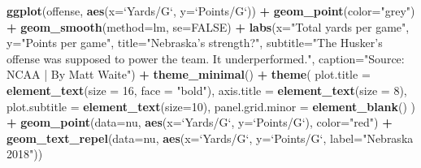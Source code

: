 \documentclass[
]{book}
\newenvironment{Shaded}{\begin{snugshade}}{\end{snugshade}}
\newcommand{\DataTypeTok}[1]{\textcolor[rgb]{0.13,0.29,0.53}{#1}}
\newcommand{\DecValTok}[1]{\textcolor[rgb]{0.00,0.00,0.81}{#1}}
\newcommand{\KeywordTok}[1]{\textcolor[rgb]{0.13,0.29,0.53}{\textbf{#1}}}
\newcommand{\NormalTok}[1]{#1}
\newcommand{\OperatorTok}[1]{\textcolor[rgb]{0.81,0.36,0.00}{\textbf{#1}}}
\newcommand{\OtherTok}[1]{\textcolor[rgb]{0.56,0.35,0.01}{#1}}
\newcommand{\StringTok}[1]{\textcolor[rgb]{0.31,0.60,0.02}{#1}}
\begin{document}
\begin{Shaded}
\begin{Highlighting}[]
\KeywordTok{ggplot}\NormalTok{(offense, }\KeywordTok{aes}\NormalTok{(}\DataTypeTok{x=}\StringTok{`}\DataTypeTok{Yards/G}\StringTok{`}\NormalTok{, }\DataTypeTok{y=}\StringTok{`}\DataTypeTok{Points/G}\StringTok{`}\NormalTok{)) }\OperatorTok{+}\StringTok{ }
\StringTok{  }\KeywordTok{geom_point}\NormalTok{(}\DataTypeTok{color=}\StringTok{"grey"}\NormalTok{) }\OperatorTok{+}\StringTok{ }\KeywordTok{geom_smooth}\NormalTok{(}\DataTypeTok{method=}\NormalTok{lm, }\DataTypeTok{se=}\OtherTok{FALSE}\NormalTok{) }\OperatorTok{+}\StringTok{ }
\StringTok{  }\KeywordTok{labs}\NormalTok{(}\DataTypeTok{x=}\StringTok{"Total yards per game"}\NormalTok{, }\DataTypeTok{y=}\StringTok{"Points per game"}\NormalTok{, }\DataTypeTok{title=}\StringTok{"Nebraska's strength?"}\NormalTok{, }\DataTypeTok{subtitle=}\StringTok{"The Husker's offense was supposed to power the team. It underperformed."}\NormalTok{, }\DataTypeTok{caption=}\StringTok{"Source: NCAA | By Matt Waite"}\NormalTok{) }\OperatorTok{+}\StringTok{ }
\StringTok{  }\KeywordTok{theme_minimal}\NormalTok{() }\OperatorTok{+}\StringTok{ }
\StringTok{  }\KeywordTok{theme}\NormalTok{(}
    \DataTypeTok{plot.title =} \KeywordTok{element_text}\NormalTok{(}\DataTypeTok{size =} \DecValTok{16}\NormalTok{, }\DataTypeTok{face =} \StringTok{"bold"}\NormalTok{),}
    \DataTypeTok{axis.title =} \KeywordTok{element_text}\NormalTok{(}\DataTypeTok{size =} \DecValTok{8}\NormalTok{), }
    \DataTypeTok{plot.subtitle =} \KeywordTok{element_text}\NormalTok{(}\DataTypeTok{size=}\DecValTok{10}\NormalTok{), }
    \DataTypeTok{panel.grid.minor =} \KeywordTok{element_blank}\NormalTok{()}
\NormalTok{    ) }\OperatorTok{+}
\StringTok{  }\KeywordTok{geom_point}\NormalTok{(}\DataTypeTok{data=}\NormalTok{nu, }\KeywordTok{aes}\NormalTok{(}\DataTypeTok{x=}\StringTok{`}\DataTypeTok{Yards/G}\StringTok{`}\NormalTok{, }\DataTypeTok{y=}\StringTok{`}\DataTypeTok{Points/G}\StringTok{`}\NormalTok{), }\DataTypeTok{color=}\StringTok{"red"}\NormalTok{) }\OperatorTok{+}\StringTok{ }
\StringTok{  }\KeywordTok{geom_text_repel}\NormalTok{(}\DataTypeTok{data=}\NormalTok{nu, }\KeywordTok{aes}\NormalTok{(}\DataTypeTok{x=}\StringTok{`}\DataTypeTok{Yards/G}\StringTok{`}\NormalTok{, }\DataTypeTok{y=}\StringTok{`}\DataTypeTok{Points/G}\StringTok{`}\NormalTok{, }\DataTypeTok{label=}\StringTok{"Nebraska 2018"}\NormalTok{))}
\end{Highlighting}
\end{Shaded}
\end{document}
